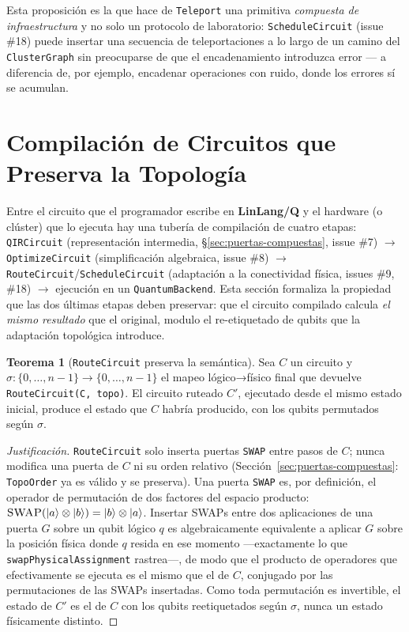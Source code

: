 \documentclass[12pt, a4paper, openany]{report}
\theoremstyle{definition}
\newtheorem{theorem}{Teorema}[chapter]
\newcommand{\linlangQ}{\textbf{LinLang/Q}}
\newcommand{\ket}[1]{\left|#1\right\rangle}
\begin{document}
Esta proposición es la que hace de \texttt{Teleport} una primitiva \emph{compuesta de infraestructura} y no solo un protocolo de laboratorio: \texttt{ScheduleCircuit} (issue \#18) puede insertar una secuencia de teleportaciones a lo largo de un camino del \texttt{ClusterGraph} sin preocuparse de que el encadenamiento introduzca error — a diferencia de, por ejemplo, encadenar operaciones con ruido, donde los errores sí se acumulan.

\section{Compilación de Circuitos que Preserva la Topología}
\label{sec:compilacion-topologica}

Entre el circuito que el programador escribe en \linlangQ{} y el hardware (o clúster) que lo ejecuta hay una tubería de compilación de cuatro etapas: \texttt{QIRCircuit} (representación intermedia, \S\ref{sec:puertas-compuestas}, issue \#7) $\to$ \texttt{OptimizeCircuit} (simplificación algebraica, issue \#8) $\to$ \texttt{RouteCircuit}/\texttt{ScheduleCircuit} (adaptación a la conectividad física, issues \#9, \#18) $\to$ ejecución en un \texttt{QuantumBackend}. Esta sección formaliza la propiedad que las dos últimas etapas deben preservar: que el circuito compilado calcula \emph{el mismo resultado} que el original, modulo el re-etiquetado de qubits que la adaptación topológica introduce.

\begin{theorem}[\texttt{RouteCircuit} preserva la semántica]
\label{thm:route-preserves-semantics}
Sea $C$ un circuito y $\sigma: \{0,\ldots,n-1\} \to \{0,\ldots,n-1\}$ el mapeo lógico→físico final que devuelve \texttt{RouteCircuit(C, topo)}. El circuito ruteado $C'$, ejecutado desde el mismo estado inicial, produce el estado que $C$ habría producido, con los qubits permutados según $\sigma$.
\end{theorem}
\begin{proof}[Justificación]
\texttt{RouteCircuit} solo inserta puertas \texttt{SWAP} entre pasos de $C$; nunca modifica una puerta de $C$ ni su orden relativo (Sección~\ref{sec:puertas-compuestas}: \texttt{TopoOrder} ya es válido y se preserva). Una puerta \texttt{SWAP} es, por definición, el operador de permutación de dos factores del espacio producto: $\textsc{SWAP}(\ket{a}\otimes\ket{b}) = \ket{b}\otimes\ket{a}$. Insertar \textsc{SWAP}s entre dos aplicaciones de una puerta $G$ sobre un qubit lógico $q$ es algebraicamente equivalente a aplicar $G$ sobre la posición física donde $q$ resida en ese momento —exactamente lo que \texttt{swapPhysicalAssignment} rastrea—, de modo que el producto de operadores que efectivamente se ejecuta es el mismo que el de $C$, conjugado por las permutaciones de las \textsc{SWAP}s insertadas. Como toda permutación es invertible, el estado de $C'$ es el de $C$ con los qubits reetiquetados según $\sigma$, nunca un estado físicamente distinto.
\end{proof}
\end{document}
